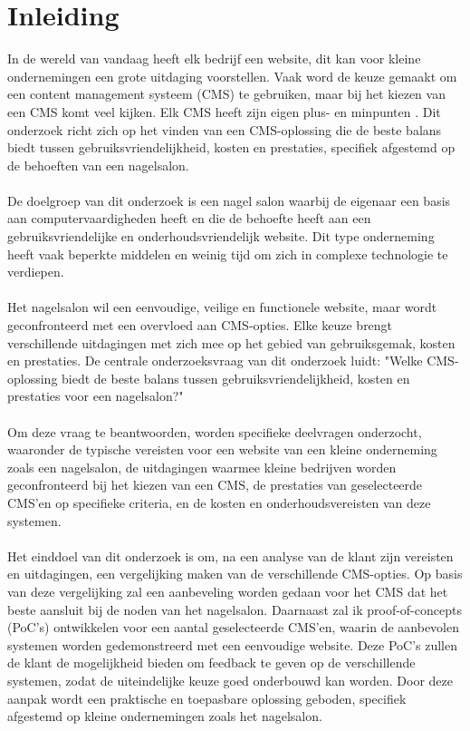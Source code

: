 
\section{Inleiding}%
\label{sec:inleiding}
\noindent
In de wereld van vandaag heeft elk bedrijf een website, dit kan voor kleine ondernemingen een grote uitdaging voorstellen. Vaak word de keuze gemaakt om een content management systeem (CMS) te gebruiken, maar bij het kiezen van een CMS komt veel kijken. Elk CMS heeft zijn eigen plus- en minpunten \autocite{Khalil2024}. Dit onderzoek richt zich op het vinden van een CMS-oplossing die de beste balans biedt tussen gebruiksvriendelijkheid, kosten en prestaties, specifiek afgestemd op de behoeften van een nagelsalon.
\\ \\
De doelgroep van dit onderzoek is een nagel salon waarbij de eigenaar een basis aan computervaardigheden heeft \autocite{Mesanovic2024} en die de behoefte heeft aan een gebruiksvriendelijke en onderhoudsvriendelijk website. Dit type onderneming heeft vaak beperkte middelen en weinig tijd om zich in complexe technologie te verdiepen.
\\ \\
Het nagelsalon wil een eenvoudige, veilige en functionele website, maar wordt geconfronteerd met een overvloed aan CMS-opties. Elke keuze brengt verschillende uitdagingen met zich mee op het gebied van gebruiksgemak, kosten en prestaties. De centrale onderzoeksvraag van dit onderzoek luidt: "Welke CMS-oplossing biedt de beste balans tussen gebruiksvriendelijkheid, kosten en prestaties voor een nagelsalon?"
\\ \\
Om deze vraag te beantwoorden, worden specifieke deelvragen onderzocht, waaronder de typische vereisten voor een website van een kleine onderneming zoals een nagelsalon, de uitdagingen waarmee kleine bedrijven worden geconfronteerd bij het kiezen van een CMS, de prestaties van geselecteerde CMS’en op specifieke criteria, en de kosten en onderhoudsvereisten van deze systemen.
\\ \\
Het einddoel van dit onderzoek is om, na een analyse van de klant zijn vereisten en uitdagingen, een vergelijking maken van de verschillende CMS-opties. Op basis van deze vergelijking zal een aanbeveling worden gedaan voor het CMS dat het beste aansluit bij de noden van het nagelsalon. Daarnaast zal ik proof-of-concepts (PoC's) ontwikkelen voor een aantal geselecteerde CMS'en, waarin de aanbevolen systemen worden gedemonstreerd met een eenvoudige website. Deze PoC's zullen de klant de mogelijkheid bieden om feedback te geven op de verschillende systemen, zodat de uiteindelijke keuze goed onderbouwd kan worden. Door deze aanpak wordt een praktische en toepasbare oplossing geboden, specifiek afgestemd op kleine ondernemingen zoals het nagelsalon.

